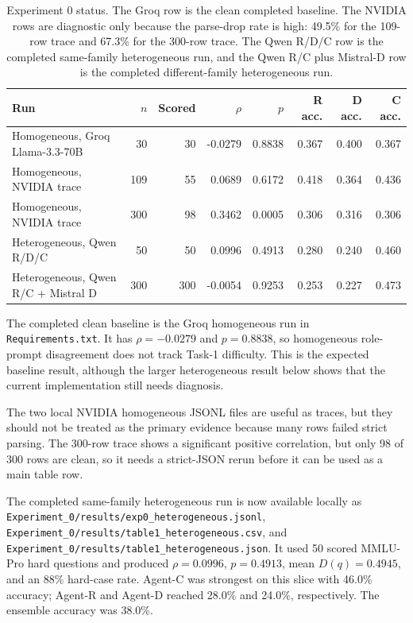 \documentclass{article}
\begin{document}
\begin{table}[h]
\centering
\begin{tabular}{lrrrrrrr}
\hline
Run & \(n\) & Scored & \(\rho\) & \(p\) & R acc. & D acc. & C acc. \\
\hline
Homogeneous, Groq Llama-3.3-70B & 30 & 30 & -0.0279 & 0.8838 & 0.367 & 0.400 & 0.367 \\
Homogeneous, NVIDIA trace & 109 & 55 & 0.0689 & 0.6172 & 0.418 & 0.364 & 0.436 \\
Homogeneous, NVIDIA trace & 300 & 98 & 0.3462 & 0.0005 & 0.306 & 0.316 & 0.306 \\
Heterogeneous, Qwen R/D/C & 50 & 50 & 0.0996 & 0.4913 & 0.280 & 0.240 & 0.460 \\
Heterogeneous, Qwen R/C + Mistral D & 300 & 300 & -0.0054 & 0.9253 & 0.253 & 0.227 & 0.473 \\
\hline
\end{tabular}
\caption{Experiment 0 status. The Groq row is the clean completed baseline.
The NVIDIA rows are diagnostic only because the parse-drop rate is high:
49.5\% for the 109-row trace and 67.3\% for the 300-row trace. The Qwen
R/D/C row is the completed same-family heterogeneous run, and the Qwen
R/C plus Mistral-D row is the completed different-family heterogeneous run.}
\end{table}

The completed clean baseline is the Groq homogeneous run in
\texttt{Requirements.txt}. It has \(\rho=-0.0279\) and \(p=0.8838\), so
homogeneous role-prompt disagreement does not track Task-1 difficulty. This is
the expected baseline result, although the larger heterogeneous result below
shows that the current implementation still needs diagnosis.

The two local NVIDIA homogeneous JSONL files are useful as traces, but they
should not be treated as the primary evidence because many rows failed strict
parsing. The 300-row trace shows a significant positive correlation, but only
98 of 300 rows are clean, so it needs a strict-JSON rerun before it can be
used as a main table row.

The completed same-family heterogeneous run is now available locally as
\texttt{Experiment\_0/results/exp0\_heterogeneous.jsonl},
\texttt{Experiment\_0/results/table1\_heterogeneous.csv}, and
\texttt{Experiment\_0/results/table1\_heterogeneous.json}. It used 50 scored
MMLU-Pro hard questions and produced \(\rho=0.0996\), \(p=0.4913\), mean
\(D(q)=0.4945\), and an 88\% hard-case rate. Agent-C was strongest on this
slice with 46.0\% accuracy; Agent-R and Agent-D reached 28.0\% and 24.0\%,
respectively. The ensemble accuracy was 38.0\%.
\end{document}
